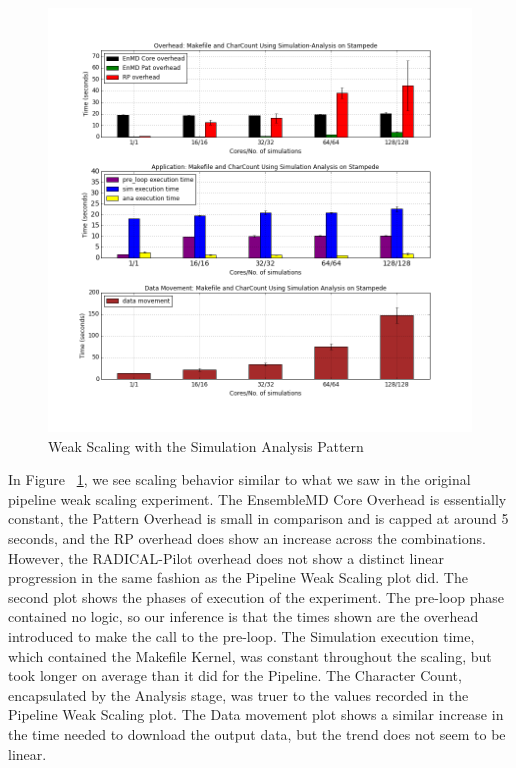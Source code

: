 \documentclass[]{article}
\begin{document}
		\begin{figure}[H]
			\centering
			\includegraphics[scale=.30]{iteration_3/sa_weak_scaling.png}
			\caption{Weak Scaling with the Simulation Analysis Pattern}
			\label{fig:sa_weak_scaling}
		\end{figure}

		In Figure ~\ref{fig:sa_weak_scaling}, we see scaling behavior similar to what we saw in the original pipeline weak scaling experiment. The EnsembleMD Core Overhead is essentially constant, the Pattern Overhead is small in comparison and is capped at around 5 seconds, and the RP overhead does show an increase across the combinations. However, the RADICAL-Pilot overhead does not show a distinct linear progression in the same fashion as the Pipeline Weak Scaling plot did. 
		The second plot shows the phases of execution of the experiment. The pre-loop phase contained no logic, so our inference is that the times shown are the overhead introduced to make the call to the pre-loop. The Simulation execution time, which contained the Makefile Kernel, was constant throughout the scaling, but took longer on average than it did for the Pipeline. The Character Count, encapsulated by the Analysis stage, was truer to the values recorded in the Pipeline Weak Scaling plot.
		The Data movement plot shows a similar increase in the time needed to download the output data, but the trend does not seem to be linear. 
\end{document}
